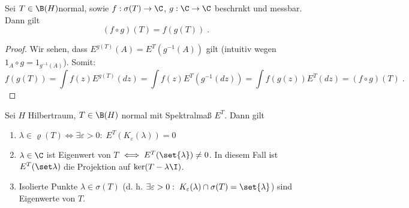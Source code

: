 		\begin{theorem}
			Sei \(T\in \B(H)\)normal, sowie \(f: \sigma(T)\to \C\), \(g:\C \to\C\) beschr\as nkt und messbar. Dann gilt \label{komposition_mess_kalk}
			\[(f\circ g)(T) = f(g(T))\;.\]
		\end{theorem}
		\begin{proof}
			Wir sehen, dass \(E^{g(T)}(A) = E^T(g^{-1}(A))\) gilt (intuitiv wegen \(1_A \circ g = 1_{g^{-1}(A)}\)). Somit:
			\[f(g(T)) = \int f(z) E^{g(T)}(dz) = \int f(z)E^T(g^{-1}(dz)) = \int f(g(z)) E^T(dz) = (f\circ g)(T)\;.\]
		\end{proof}
		\begin{theorem}
			Sei $H$ Hilbertraum, \(T\in \B(H)\) normal mit Spektralma\ss{} \(E^T\). Dann gilt 
			\begin{enumerate}
				\item \(\lambda \in \varrho(T) \iff \exists \varepsilon > 0:\; E^T(K_\varepsilon(\lambda)) = 0\) \label{spektralmass_spektrum_1}
				\item \(\lambda \in \C\) ist Eigenwert von $T$ \(\iff E^T(\set{\lambda}) \neq 0\). In diesem Fall ist \(E^T(\set\lambda)\) die Projektion auf \(\ker(T-\lambda\I)\). \label{spektralmass_spektrum_2}
				\item Isolierte Punkte \(\lambda \in \sigma(T)\) (d. h. \(\exists \varepsilon > 0:\; K_\varepsilon(\lambda)\cap \sigma(T) = \set{\lambda}\)) sind Eigenwerte von $T$. \label{spektralmass_spektrum_3}
			\end{enumerate}
		\end{theorem}

